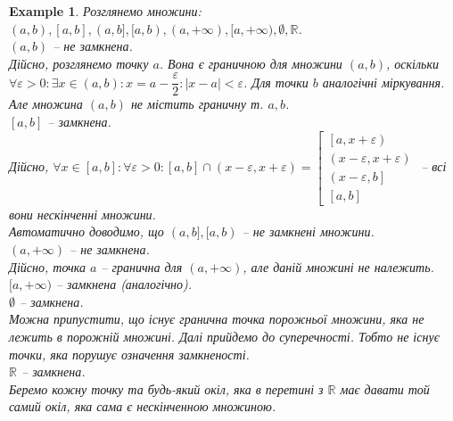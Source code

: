 \documentclass[a4paper, 14pt]{article}
\theoremstyle{theoremdd}
\theoremstyle{theoremdd}
\theoremstyle{theoremdd}
\theoremstyle{theoremdd}
\newtheorem{example}[theorem]{Example}
\theoremstyle{theoremdd}
\theoremstyle{theoremdd}
\theoremstyle{theoremdd}
\theoremstyle{theoremdd}
\begin{document}
\begin{example}
Розглянемо множини: $(a,b), [a,b], (a,b], [a,b), (a,+\infty), [a,+\infty), \emptyset, \mathbb{R}$.\\
$(a,b)$ -- не замкнена. \\
Дійсно, розглянемо точку $a$. Вона є граничною для множини $(a,b)$, оскільки $\forall \varepsilon > 0: \exists x \in (a,b): x = a - \dfrac{\varepsilon}{2}: |x-a| < \varepsilon$. Для точки $b$ аналогічні міркування. Але множина $(a,b)$ не містить граничну т. $a,b$.
\bigskip \\
$[a,b]$ -- замкнена. \\
Дійсно, $\forall x \in [a,b]: \forall \varepsilon > 0: [a,b] \cap (x-\varepsilon,x+\varepsilon) = \left[
\begin{gathered}
\left[a,x+\varepsilon \right) \\
\left(x-\varepsilon, x + \varepsilon \right) \\
\left(x - \varepsilon, b\right] \\
\left[a,b\right]
\end{gathered}
 \right.$ -- всі вони нескінченні множини.
\bigskip \\
Автоматично доводимо, що $(a,b], [a,b)$ -- не замкнені множини.
\bigskip \\
$(a,+\infty)$ -- не замкнена. \\
Дійсно, точка $a$ -- гранична для $(a,+\infty)$, але даній множині не належить.
\bigskip \\
$[a,+\infty)$ -- замкнена (аналогічно).
\bigskip \\
$\emptyset$ -- замкнена.\\
Можна припустити, що існує гранична точка порожньої множини, яка не лежить в порожній множині. Далі прийдемо до суперечності. Тобто не існує точки, яка порушує означення замкненості.
\bigskip \\
$\mathbb{R}$ -- замкнена.\\
Беремо кожну точку та будь-який окіл, яка в перетині з $\mathbb{R}$ має давати той самий окіл, яка сама є нескінченною множиною.
\end{example}
\end{document}
